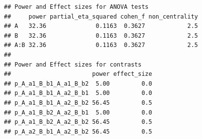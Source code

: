 \documentclass[]{book}
\newenvironment{Shaded}{\begin{snugshade}}{\end{snugshade}}
\newcommand{\CommentTok}[1]{\textcolor[rgb]{0.56,0.35,0.01}{\textit{#1}}}
\newcommand{\DataTypeTok}[1]{\textcolor[rgb]{0.13,0.29,0.53}{#1}}
\newcommand{\DecValTok}[1]{\textcolor[rgb]{0.00,0.00,0.81}{#1}}
\newcommand{\FloatTok}[1]{\textcolor[rgb]{0.00,0.00,0.81}{#1}}
\newcommand{\KeywordTok}[1]{\textcolor[rgb]{0.13,0.29,0.53}{\textbf{#1}}}
\newcommand{\NormalTok}[1]{#1}
\newcommand{\OperatorTok}[1]{\textcolor[rgb]{0.81,0.36,0.00}{\textbf{#1}}}
\newcommand{\StringTok}[1]{\textcolor[rgb]{0.31,0.60,0.02}{#1}}
\begin{document}
\begin{Shaded}
\end{Shaded}

\begin{verbatim}
## Power and Effect sizes for ANOVA tests
##     power partial_eta_squared cohen_f non_centrality
## A   32.36              0.1163  0.3627            2.5
## B   32.36              0.1163  0.3627            2.5
## A:B 32.36              0.1163  0.3627            2.5
## 
## Power and Effect sizes for contrasts
##                       power effect_size
## p_A_a1_B_b1_A_a1_B_b2  5.00         0.0
## p_A_a1_B_b1_A_a2_B_b1  5.00         0.0
## p_A_a1_B_b1_A_a2_B_b2 56.45         0.5
## p_A_a1_B_b2_A_a2_B_b1  5.00         0.0
## p_A_a1_B_b2_A_a2_B_b2 56.45         0.5
## p_A_a2_B_b1_A_a2_B_b2 56.45         0.5
\end{verbatim}

\begin{Shaded}
\end{Shaded}
\end{document}
